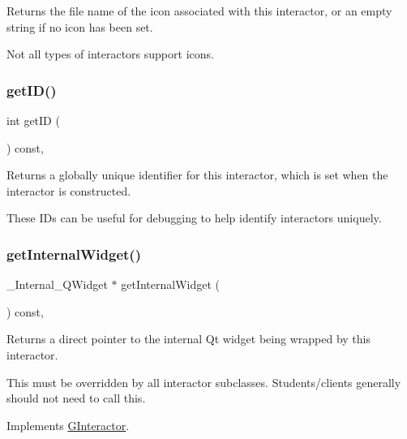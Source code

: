 Returns the file name of the icon associated with this interactor, or an empty string if no icon has been set. 

Not all types of interactors support icons. \mbox{\label{classGInteractor_a9c9659a6c6ba66b4107ba59c95a24241}} 
\subsubsection{\texorpdfstring{get\+I\+D()}{getID()}}
{\footnotesize\ttfamily int get\+ID (\begin{DoxyParamCaption}{ }\end{DoxyParamCaption}) const\hspace{0.3cm}{\ttfamily [virtual]}, {\ttfamily [inherited]}}



Returns a globally unique identifier for this interactor, which is set when the interactor is constructed. 

These I\+Ds can be useful for debugging to help identify interactors uniquely. \mbox{\label{classGCanvas_a2f6b36b2517087dc90a366b5ce1f5323}} 
\subsubsection{\texorpdfstring{get\+Internal\+Widget()}{getInternalWidget()}}
{\footnotesize\ttfamily \+\_\+\+Internal\+\_\+\+Q\+Widget $\ast$ get\+Internal\+Widget (\begin{DoxyParamCaption}{ }\end{DoxyParamCaption}) const\hspace{0.3cm}{\ttfamily [override]}, {\ttfamily [virtual]}}



Returns a direct pointer to the internal Qt widget being wrapped by this interactor. 

This must be overridden by all interactor subclasses. Students/clients generally should not need to call this. 

Implements \mbox{\hyperlink{classGInteractor}{G\+Interactor}}.

\mbox{\label{classGDrawingSurface_aaf1f5ea8281e5e3486662878d26f0a13}} 
